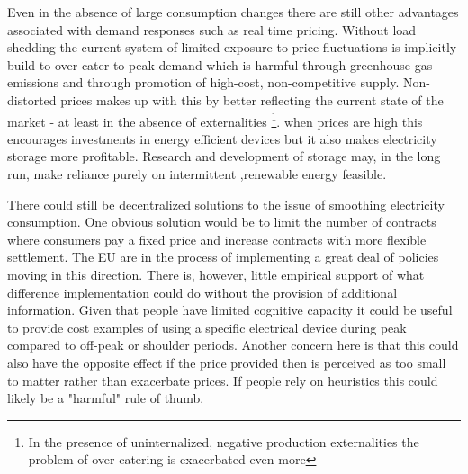 Even in the absence of large consumption changes there are still other advantages associated with demand responses such as real time pricing. Without load shedding the current system of limited exposure to price fluctuations is implicitly build to over-cater to peak demand which is harmful through greenhouse gas emissions and through promotion of high-cost, non-competitive supply. Non-distorted prices makes up with this by better reflecting the current state of the market - at least in the absence of externalities \footnote{In the presence of uninternalized, negative production externalities the problem of over-catering is exacerbated even more}. when prices are high this encourages investments in energy efficient devices but it also makes electricity storage more profitable. Research and development of storage may, in the long run,  make reliance purely on intermittent ,renewable energy feasible.
\bigskip

There could still be decentralized solutions to the issue of smoothing electricity consumption. One obvious solution would be to limit the number of contracts where consumers pay a fixed price and increase contracts with more flexible settlement. The EU are in the process of implementing a great deal of policies moving in this direction. There is, however, little empirical support of what difference implementation could do without the provision of additional information. Given that people have limited cognitive capacity it could be useful to provide cost examples of using a specific electrical device during peak compared to off-peak or shoulder periods.
Another concern here is that this could also have the opposite effect if the price provided then is perceived as too small to matter rather than exacerbate prices. If people rely on heuristics this could likely be a "harmful" rule of thumb.
\bigskip

